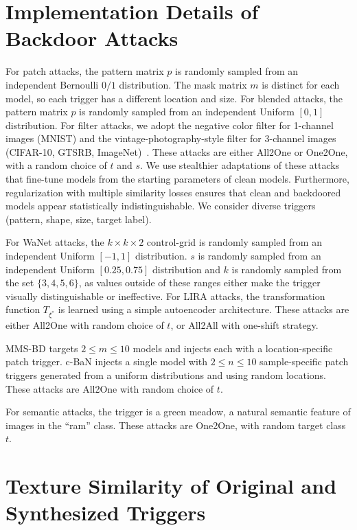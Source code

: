 \documentclass[letterpaper,twocolumn,10pt]{article}
\begin{document}
\begin{appendices}

\section{Implementation Details of Backdoor Attacks}
\label{appendix:A}
For patch attacks, the pattern matrix $p$ is randomly sampled from an independent Bernoulli $0/1$ distribution. The mask matrix $m$ is distinct for each model, so each trigger has a different location and size. For blended attacks, the pattern matrix $p$ is randomly sampled from an independent Uniform $[0,1]$ distribution. For filter attacks, we adopt the negative color filter for 1-channel images (MNIST) and the vintage-photography-style filter for 3-channel images (CIFAR-10, GTSRB, ImageNet)~\cite{fu2023eagle}. These attacks are either All2One or One2One, with a random choice of $t$ and $s$. We use stealthier adaptations of these attacks that fine-tune models from the starting parameters of clean models. Furthermore, regularization with multiple similarity losses ensures that clean and backdoored models appear statistically indistinguishable. We consider diverse triggers (pattern, shape, size, target label).

For WaNet attacks, the $k\times k\times2$ control-grid is randomly sampled from an independent Uniform $[-1,1]$ distribution. $s$ is randomly sampled from an independent Uniform $[0.25,0.75]$ distribution and $k$ is randomly sampled from the set $\{3,4,5,6\}$, as values outside of these ranges either make the trigger visually distinguishable or ineffective. For LIRA attacks, the transformation function $T_{\xi^{*}}$ is learned using a simple autoencoder architecture. These attacks are either All2One with random choice of $t$, or All2All with one-shift strategy. 

MMS-BD targets $2\leq m\leq10$ models and injects each with a location-specific patch trigger. c-BaN injects a single model with $2\leq n\leq10$ sample-specific patch triggers generated from a uniform distributions and using random locations. These attacks are All2One with random choice of $t$.

For semantic attacks, the trigger is a green meadow, a natural semantic feature of images in the ``ram'' class. These attacks are One2One, with random target class $t$.

\section{Texture Similarity of Original and Synthesized Triggers}
\label{appendix:B}


\end{appendices}
\end{document}
